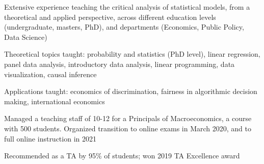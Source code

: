 \documentclass[10pt]{article}
\begin{document}
\begin{blist}

\item Extensive experience teaching the critical analysis of statistical models, from a theoretical and applied perspective, across different education levels (undergraduate, masters, PhD), and departments (Economics, Public Policy, Data Science)
\begin{blist}
\item Theoretical topics taught: probability and statistics (PhD level), linear regression, panel data analysis, introductory data analysis, linear programming, data visualization, causal inference
\item Applications taught: 
    economics of discrimination, 
    fairness in algorithmic decision making, 
    international economics
\end{blist}


\item Managed a teaching staff of 10-12 for a Principals of Macroeconomics, a course with 500 students. Organized transition to online exams in March 2020, and to full online instruction in 2021

\item Recommended as a TA by 95\% of students; won 2019 TA Excellence award




\end{blist}
\end{document}
